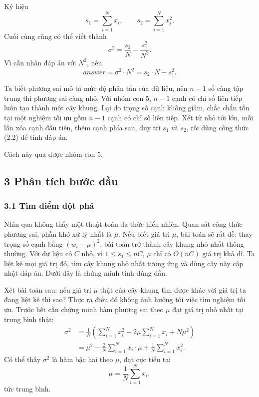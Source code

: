 \documentclass[11pt]{article}
\begin{document}
Ký hiệu
\[
  s_1=\sum_{i=1}^{N}x_i,\qquad s_2=\sum_{i=1}^{N}x_i^2.
\]
Cuối cùng cũng có thể viết thành
\[
  \sigma^2=\frac{s_2}{N}-\frac{s_1^2}{N^2}. \tag{2.1}
\]
Vì cần nhân đáp án với \(N^2\), nên
\[
  \textit{answer}=\sigma^2\cdot N^2=s_2\cdot N-s_1^2. \tag{2.2}
\]

Ta biết phương sai mô tả mức độ phân tán của dữ liệu, nên \(n-1\) số càng tập
trung thì phương sai càng nhỏ. Với nhóm con 5, \(n-1\) cạnh có chỉ số liên tiếp
luôn tạo thành một cây khung. Lại do trọng số cạnh không giảm, chắc chắn tồn
tại một nghiệm tối ưu gồm \(n-1\) cạnh có chỉ số liên tiếp. Xét từ nhỏ tới lớn,
mỗi lần xóa cạnh đầu tiên, thêm cạnh phía sau, duy trì \(s_1\) và \(s_2\), rồi
dùng công thức (2.2) để tính đáp án.

Cách này qua được nhóm con 5.

\subsection*{3 Phân tích bước đầu}

\subsubsection*{3.1 Tìm điểm đột phá}

Nhìn qua không thấy một thuật toán đa thức hiển nhiên. Quan sát công thức
phương sai, phần khó xử lý nhất là \(\mu\). Nếu biết giá trị \(\mu\), bài toán
sẽ rất dễ: thay trọng số cạnh bằng \((w_i-\mu)^2\), bài toán trở thành cây
khung nhỏ nhất thông thường. Với dữ liệu có \(C\) nhỏ, vì \(1\le s_1\le nC\),
\(\mu\) chỉ có \(O(nC)\) giá trị khả dĩ. Ta liệt kê mọi giá trị đó, tìm cây
khung nhỏ nhất tương ứng và dùng cây này cập nhật đáp án. Dưới đây là chứng
minh tính đúng đắn.

Xét bài toán sau: nếu giá trị \(\mu\) thật của cây khung tìm được khác với giá
trị ta đang liệt kê thì sao? Thực ra điều đó không ảnh hưởng tới việc tìm
nghiệm tối ưu. Trước hết cần chứng minh hàm phương sai theo \(\mu\) đạt giá trị
nhỏ nhất tại trung bình thật:
\begin{equation}
\begin{aligned}
  \sigma^2
  &=\frac1N\left(\sum_{i=1}^{N}x_i^2
      -2\mu\sum_{i=1}^{N}x_i+N\mu^2\right)\\
  &=\mu^2-\frac2N\sum_{i=1}^{N}x_i\cdot\mu
      +\frac1N\sum_{i=1}^{N}x_i^2.
\end{aligned}
\tag{3.1}
\end{equation}
Có thể thấy \(\sigma^2\) là hàm bậc hai theo \(\mu\), đạt cực tiểu tại
\[
  \mu=\frac1N\sum_{i=1}^{N}x_i,
\]
tức trung bình.
\end{document}
